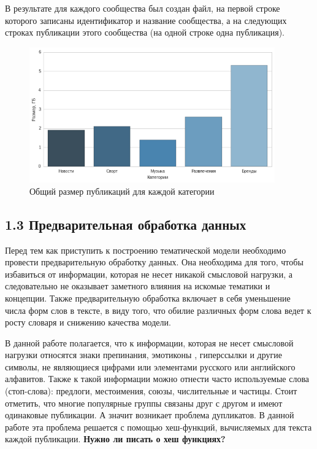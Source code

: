 \documentclass[a4paper]{report}
\begin{document}
В результате для каждого сообщества был создан файл, на первой строке которого записаны идентификатор и название сообщества, а на следующих строках публикации этого сообщества (на одной строке одна публикация).

	\begin{figure}
		\centering
		\includegraphics[width=400px]
		{imgs/SizeCat.png}
		\caption{Общий размер публикаций для каждой категории}
		\label{fig:sizecat}
	\end{figure} 
	
	
	
	
	
	
	\subsection{1.3 Предварительная обработка данных}
	Перед тем как приступить к построению тематической модели необходимо провести предварительную обработку данных. 
	Она необходима для того, чтобы избавиться от информации, которая не несет никакой смысловой нагрузки, а следовательно не оказывает заметного влияния на искомые тематики и концепции. 
	Также предварительную обработка включает в себя уменьшение числа форм слов в тексте, в виду того, что обилие различных форм слова ведет к росту словаря и снижению качества модели.
	
	В данной работе полагается, что к информации, которая не несет смысловой нагрузки относятся знаки препинания, эмотиконы \cite{bib:smiley}, гиперссылки и другие символы, не являющиеся цифрами или элементами русского или английского алфавитов. Также к такой информации можно отнести часто используемые слова (стоп-слова): предлоги, местоимения, союзы, числительные и частицы\cite{bib:InformationRetrieval}.
	Стоит отметить, что многие популярные группы связаны друг с другом и имеют одинаковые публикации. А значит возникает проблема дупликатов. В данной работе эта проблема решается с помощью хеш-функций, вычисляемых для текста каждой публикации. \textbf{Нужно ли писать о хеш функциях?}
	
\end{document}
